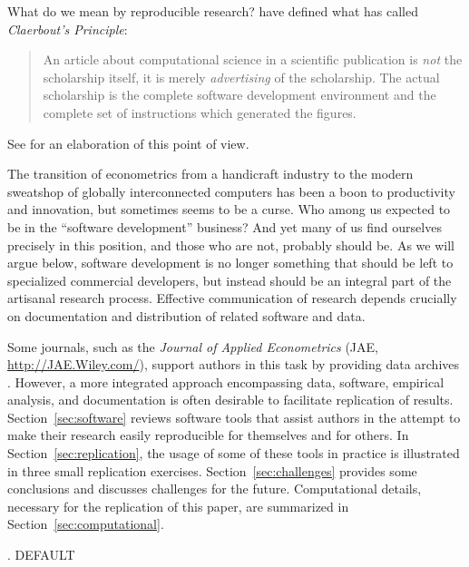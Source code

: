 \documentclass[10pt,a4paper,twoside]{article}
\renewcommand{\section}{\secdef \mysec \mysecnn}
\newcommand{\mysec}[2][default]{\vspace{1.7\baselineskip}%
  \pdfbookmark[1]{#1}{Section.#1}%
  \refstepcounter{section}%
  \centerline{\large \thesection. \uppercase{#1}} \vspace{.5\baselineskip}}
\newcommand{\mysecnn}[1]{\vspace{1.7\baselineskip}%
  \centerline{\large #1} \vspace{.5\baselineskip}}
\begin{document}
What do we mean by reproducible
research?  \cite{repro:Buckheit+Donoho:1995} have defined what
\cite{repro:deLeeuw:2001} has called \emph{Claerbout's Principle}:

\begin{quote}
An article about computational science in a scientific publication
is \emph{not} the scholarship itself, it is merely \emph{advertising}
of the scholarship. The actual scholarship is the complete software
development environment and the complete set of instructions which
generated the figures.
\end{quote}

See \cite{repro:Schwab+Karrenbach+Claerbout:2000} 
for an elaboration of this point of view. 

The transition of econometrics from a handicraft industry
\citep{repro:Wilson:1973,repro:Goldberger:2004}
to the modern sweatshop of globally interconnected computers
has been a boon to productivity and innovation, but sometimes
seems to be a curse.  Who among us expected to be in the ``software
development'' business?  And yet many of us find ourselves  precisely
in this position, and those who are not, probably should be.  As
we will argue below, software development is no longer something  that
should be left to specialized commercial developers, but instead should
be an integral part of the artisanal research process.  Effective
communication of research depends crucially on documentation and
distribution of related software and data.

Some journals, such as the \emph{Journal of Applied Econometrics}
(JAE, \url{http://JAE.Wiley.com/}), support authors in this task
by providing data archives \citep{repro:MacKinnon:2007}. However,
a more integrated approach encompassing data, software, empirical
analysis, and documentation is often desirable to facilitate
replication of results. Section~\ref{sec:software} reviews
software tools that assist authors in the attempt to make their
research easily reproducible for themselves and for others. In
Section~\ref{sec:replication}, the usage of some of these tools
in practice is illustrated in three small replication exercises. Section~\ref{sec:challenges}
provides some conclusions and discusses challenges for the future.
Computational details, necessary for the replication of this paper,
are summarized in Section~\ref{sec:computational}.

\section{Software Tools} \label{sec:software}
\end{document}
